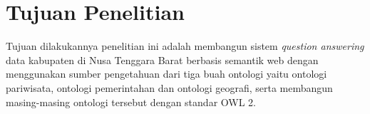 \section{Tujuan Penelitian}
Tujuan dilakukannya penelitian ini adalah membangun sistem \textit{question answering} data kabupaten di Nusa Tenggara Barat berbasis semantik web dengan menggunakan sumber pengetahuan dari tiga buah ontologi yaitu ontologi pariwisata, ontologi pemerintahan dan ontologi geografi, serta membangun masing-masing ontologi tersebut dengan standar OWL 2.